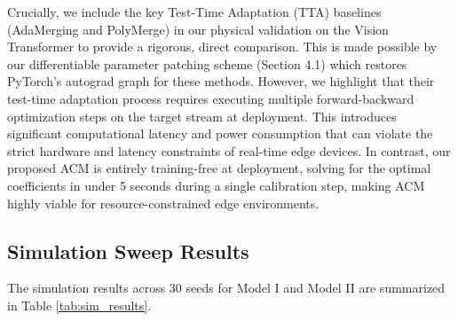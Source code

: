 Crucially, we include the key Test-Time Adaptation (TTA) baselines (AdaMerging and PolyMerge) in our physical validation on the Vision Transformer to provide a rigorous, direct comparison. This is made possible by our differentiable parameter patching scheme (Section 4.1) which restores PyTorch's autograd graph for these methods. However, we highlight that their test-time adaptation process requires executing multiple forward-backward optimization steps on the target stream at deployment. This introduces significant computational latency and power consumption that can violate the strict hardware and latency constraints of real-time edge devices. In contrast, our proposed ACM is entirely training-free at deployment, solving for the optimal coefficients in under 5 seconds during a single calibration step, making ACM highly viable for resource-constrained edge environments.

\subsection{Simulation Sweep Results}
The simulation results across 30 seeds for Model I and Model II are summarized in Table \ref{tab:sim_results}.

